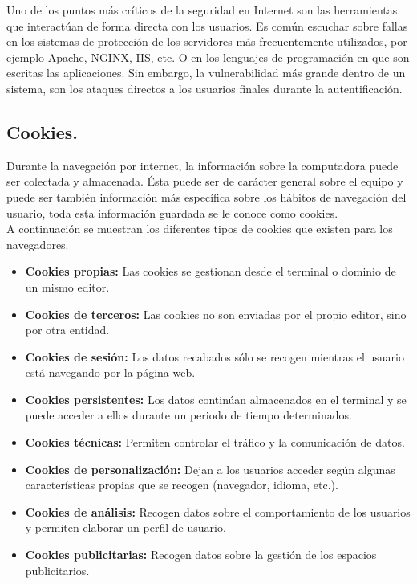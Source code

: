 \documentclass[12pt, a4paper, titlepage]{article}
\begin{document}
		Uno de los puntos más críticos de la seguridad en Internet son las herramientas que interactúan de forma directa con los usuarios. Es común escuchar sobre fallas en los sistemas de protección de los servidores más frecuentemente utilizados, por ejemplo Apache, NGINX, IIS, etc. O en los lenguajes de programación en que son escritas las aplicaciones. \cite{refSeguridadWeb} Sin embargo, la vulnerabilidad más grande dentro de un sistema, son los ataques directos a los usuarios finales durante la autentificación.\\
		
		\subsection{Cookies.}
		Durante la navegación por internet, la información sobre la computadora puede ser colectada y almacenada. Ésta puede ser de carácter general sobre el equipo y puede ser también información más específica sobre los hábitos de navegación del usuario, toda esta información guardada se le conoce como \Gls{cookies}\cite{refCookies}. \\
		A continuación se muestran los diferentes tipos de cookies que existen para los navegadores.
		
		\begin{itemize}
		    \item \textbf{Cookies propias:} Las cookies se gestionan desde el terminal o dominio de un mismo editor.
		    \item \textbf{Cookies de terceros:} Las cookies no son enviadas por el propio editor, sino por otra entidad.  
		    \item \textbf{Cookies de sesión:} Los datos recabados sólo se recogen mientras el usuario está navegando por la página web.
		    \item \textbf{Cookies persistentes:} Los datos continúan almacenados en el terminal y se puede acceder a ellos durante un periodo de tiempo determinados.
		    \item \textbf{Cookies técnicas:} Permiten controlar el tráfico y la comunicación de datos.		
            \item \textbf{Cookies de personalización:} Dejan a los usuarios acceder según algunas características propias que se recogen (navegador, idioma, etc.).
            \item \textbf{Cookies de análisis:} Recogen datos sobre el comportamiento de los usuarios y permiten elaborar un perfil de usuario.
            \item \textbf{Cookies publicitarias:} Recogen datos sobre la gestión de los espacios publicitarios.
        \end{itemize}
		
\end{document}
